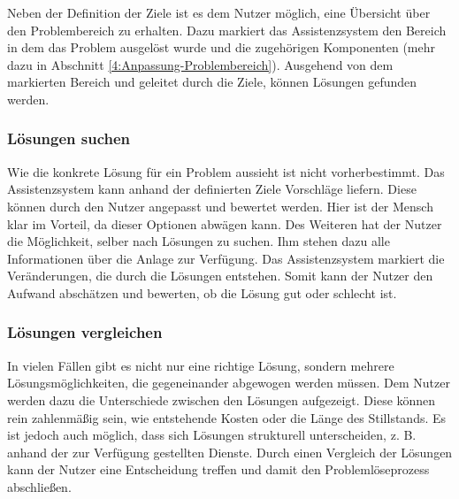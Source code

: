 Neben der Definition der Ziele ist es dem Nutzer möglich, eine Übersicht über den Problembereich zu erhalten. Dazu markiert das Assistenzsystem den Bereich in dem das Problem ausgelöst wurde und die zugehörigen Komponenten (mehr dazu in Abschnitt \ref{4:Anpassung-Problembereich}).
Ausgehend von dem markierten Bereich und geleitet durch die Ziele, können Lösungen gefunden werden.

\subsubsection*{Lösungen suchen}
Wie die konkrete Lösung für ein Problem aussieht ist nicht vorherbestimmt. Das Assistenzsystem kann anhand der definierten Ziele Vorschläge liefern. Diese können durch den Nutzer angepasst und bewertet werden. Hier ist der Mensch klar im Vorteil, da dieser Optionen abwägen kann. Des Weiteren  hat der Nutzer die Möglichkeit, selber nach Lösungen zu suchen. Ihm stehen dazu alle Informationen über die Anlage zur Verfügung. Das Assistenzsystem markiert die Veränderungen, die durch die Lösungen entstehen. Somit kann der Nutzer den Aufwand abschätzen und bewerten, ob die Lösung gut oder schlecht ist.

\subsubsection*{Lösungen vergleichen}
In vielen Fällen gibt es nicht nur eine richtige Lösung,  sondern mehrere Lösungsmöglichkeiten, die gegeneinander abgewogen werden müssen. Dem Nutzer werden dazu die Unterschiede zwischen den Lösungen aufgezeigt. Diese können rein zahlenmäßig sein, wie entstehende Kosten oder die Länge des Stillstands. Es ist jedoch auch möglich, dass sich Lösungen strukturell unterscheiden, z. B. anhand der zur Verfügung gestellten Dienste. Durch einen Vergleich der Lösungen kann der Nutzer eine Entscheidung treffen und damit den Problemlöseprozess abschließen.

